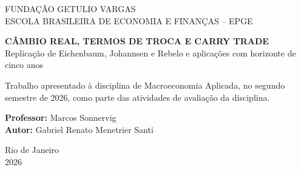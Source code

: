 \documentclass[11pt,a4paper]{article}
\begin{document}
\begin{titlepage}
    \centering
    \vspace*{1.6cm}
    {\large FUNDAÇÃO GETULIO VARGAS\\[0.15cm]
    ESCOLA BRASILEIRA DE ECONOMIA E FINANÇAS -- EPGE\\[1.7cm]}

    {\Large\bfseries CÂMBIO REAL, TERMOS DE TROCA E CARRY TRADE\\[0.4cm]}
    {\large Replicação de Eichenbaum, Johannsen e Rebelo e aplicações com horizonte de cinco anos\\[2.0cm]}

    \begin{flushleft}
    \hspace{7.2cm}\begin{minipage}{7.2cm}
    Trabalho apresentado à disciplina de Macroeconomia Aplicada, no segundo semestre de 2026, como parte das atividades de avaliação da disciplina.

    \vspace{0.8cm}
    \textbf{Professor:} Marcos Sonnervig\\
    \textbf{Autor:} Gabriel Renato Menetrier Santi
    \end{minipage}
    \end{flushleft}

    \vfill
    Rio de Janeiro\\
    2026
\end{titlepage}

\begin{abstract}
\noindent
Este trabalho parte da relação entre câmbio real e câmbio nominal discutida em Eichenbaum, Johannsen e Rebelo (2021) e apresentada em aula. Primeiro, reproduzimos o resultado brasileiro de longo prazo e verificamos se a relação mantém capacidade preditiva fora da amostra em um painel de seis moedas. Em seguida, investigamos se essa informação pode melhorar estratégias de carry trade. Como extensão, incorporamos termos de troca à previsão cambial e testamos diferentes formas de converter os sinais em carteiras. A replicação brasileira é forte, mas o desempenho internacional é heterogêneo. A aplicação mensal da previsão de cinco anos não supera o carry puro. Termos de troca melhoram de forma importante a previsão brasileira, mas não geram melhora generalizada das carteiras. O resultado econômico mais interessante aparece em um recorte retrospectivo de Brasil, euro e Canadá, no qual o sinal EJR, com escolha anual e pesos de máximo Sharpe, apresenta retorno histórico superior ao carry no período analisado. Como a mesma amostra foi usada para selecionar e avaliar alternativas, esse resultado deve ser interpretado como exploratório, e não como evidência de arbitragem.

\vspace{0.35cm}
\noindent\textbf{Palavras-chave:} câmbio real; previsão cambial; termos de troca; carry trade; Eichenbaum--Johannsen--Rebelo.
\end{abstract}
\end{document}
